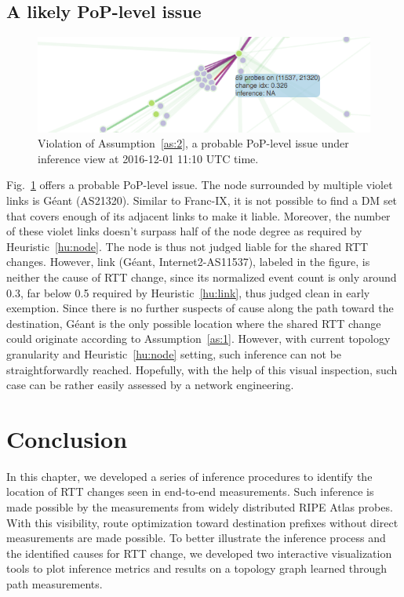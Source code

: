 \subsection{A likely PoP-level issue}
\begin{figure}[!htb]
\centering
\includegraphics[width=.8\textwidth]{gfx/chap5/case_pop_issue.png}
\caption{Violation of Assumption~\ref{as:2}, a probable PoP-level issue under inference view at 2016-12-01 11:10 UTC time.}
\label{fig:case_pop_issue}
\end{figure}

Fig.~\ref{fig:case_pop_issue} offers a probable PoP-level issue. The node surrounded by multiple violet links is 
Géant (AS21320). 
Similar to Franc-IX, it is not possible to find a \ac{DM} set that covers enough of its adjacent links to make it liable. Moreover, the number of these violet links doesn't surpass half of the node degree as required by Heuristic~\ref{hu:node}. The node is thus not judged liable for the shared RTT changes. 
However, link (Géant, Internet2-AS11537), labeled in the figure, is neither the cause of RTT change, since its normalized event count is only around 0.3, far below 0.5 required by Heuristic~\ref{hu:link}, thus judged clean in early exemption.
Since there is no further suspects of cause along the path toward the destination, Géant is the only possible location where the shared RTT change could originate according to Assumption~\ref{as:1}. However, with current topology granularity and Heuristic~\ref{hu:node} setting, such inference can not be straightforwardly reached.
Hopefully, with the help of this visual inspection, such case can be rather easily assessed by a network engineering.

\section*{Conclusion}
In this chapter, we developed a series of inference procedures to identify the location of RTT changes seen in end-to-end measurements.
Such inference is made possible by the measurements from widely distributed RIPE Atlas probes.
With this visibility, route optimization toward destination prefixes without direct measurements are made possible.
To better illustrate the inference process and the identified causes for RTT change, we developed two interactive visualization tools to plot inference metrics and results on a topology graph learned through path measurements.

